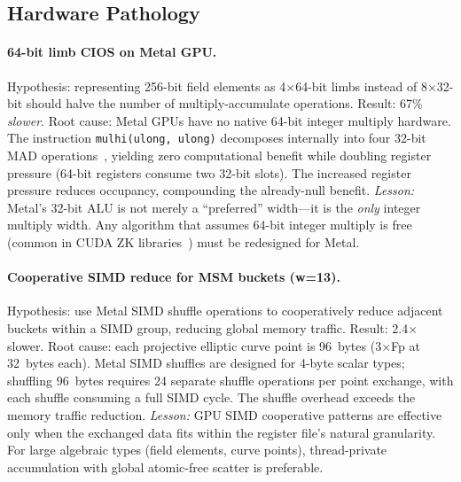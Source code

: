 \subsection{Hardware Pathology}
\label{sec:dead-hw}

\paragraph{64-bit limb CIOS on Metal GPU.}
Hypothesis: representing 256-bit field elements as 4$\times$64-bit limbs instead of 8$\times$32-bit should halve the number of multiply-accumulate operations.
Result: 67\% \emph{slower}.
Root cause: Metal GPUs have no native 64-bit integer multiply hardware.
The instruction \texttt{mulhi(ulong, ulong)} decomposes internally into four 32-bit MAD operations~\cite{metal-spec}, yielding zero computational benefit while doubling register pressure (64-bit registers consume two 32-bit slots).
The increased register pressure reduces occupancy, compounding the already-null benefit.
\emph{Lesson:} Metal's 32-bit ALU is not merely a ``preferred'' width---it is the \emph{only} integer multiply width.
Any algorithm that assumes 64-bit integer multiply is free (common in CUDA ZK libraries~\cite{cuzk, zprize2022}) must be redesigned for Metal.

\paragraph{Cooperative SIMD reduce for MSM buckets (w=13).}
Hypothesis: use Metal SIMD shuffle operations to cooperatively reduce adjacent buckets within a SIMD group, reducing global memory traffic.
Result: 2.4$\times$ slower.
Root cause: each projective elliptic curve point is 96~bytes (3$\times$Fp at 32~bytes each).
Metal SIMD shuffles are designed for 4-byte scalar types; shuffling 96~bytes requires 24 separate shuffle operations per point exchange, with each shuffle consuming a full SIMD cycle.
The shuffle overhead exceeds the memory traffic reduction.
\emph{Lesson:} GPU SIMD cooperative patterns are effective only when the exchanged data fits within the register file's natural granularity.
For large algebraic types (field elements, curve points), thread-private accumulation with global atomic-free scatter is preferable.

